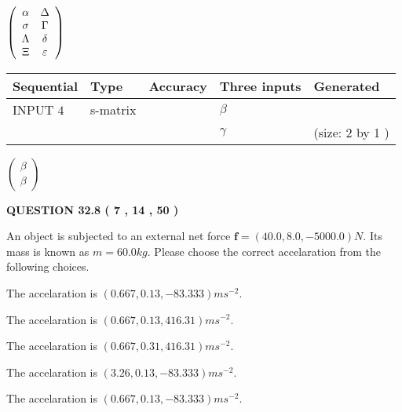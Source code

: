 \documentclass[12pt]{article}
\begin{document}
   
 $  \left( \begin{array}
 {
 c
 c
 }
 \alpha & 
 \Delta \\ 
 \sigma & 
 \Gamma \\ 
 \Lambda & 
 \delta \\ 
                    \Xi & 
 \varepsilon
 \end{array} \right) $ 
  
  
\noindent\begin{tabular}{|l|l|l|l|l|}
\hline
 Sequential & Type & Accuracy & Three inputs & Generated \\ 
\hline
 
 
  INPUT $            4 $ & s-matrix & & 
 $  \beta $ & 
  \\
  & & & 
 $  \gamma $ & 
  (size:            2  by            1 )
 \\  \hline  
 \end{tabular}
   
   
 $  \left( \begin{array}
 {
 c
 }
 \beta \\ 
 \beta
 \end{array} \right) $ 
  
\vspace{0.2in}
  
{\textbf{\Large{QUESTION
32.8 
 (           7 ,          14 ,          50 )
}}}
  
  
 
An object is subjected to an external net force $\mathbf{f}=
(40.0 , 8.0 , -5000.0) N$.
Its mass is known as $m= %
60.0 kg$.
Please choose the correct accelaration from the following choices.
 
 
  The accelaration is $  %
(
0.667,
0.13,
-83.333)
ms^{-2} $.
 
 
  The accelaration is $  %
(
0.667,
0.13,
416.31)
ms^{-2} $.
 
 
  The accelaration is $  %
(
0.667,
0.31,
416.31)
ms^{-2} $.
 
 
  The accelaration is $  %
(
3.26,
0.13,
-83.333)
ms^{-2} $.
 
 
\noindent{}
 
 
  The accelaration is $  %
(
0.667,
0.13,
-83.333)
ms^{-2} $.
 
 
\noindent{}
 
\end{document}
